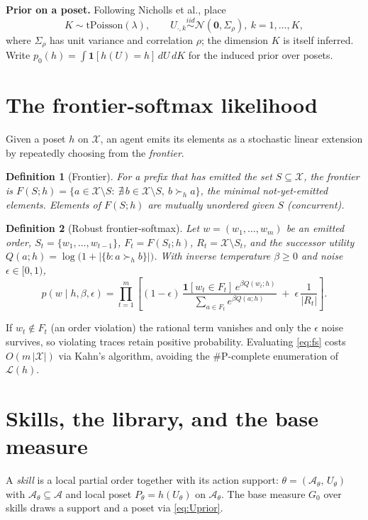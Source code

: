 \documentclass[11pt]{article}
\newtheorem{definition}{Definition}
\newcommand{\sA}{\mathcal{A}}
\newcommand{\sX}{\mathcal{X}}
\newcommand{\sL}{\mathcal{L}}
\newcommand{\ind}[1]{\mathbf{1}\!\left[#1\right]}
\newcommand{\Pois}{\mathrm{tPoisson}}
\begin{document}
\noindent
\textbf{Prior on a poset.} Following Nicholls et al., place
\begin{equation}
K\sim\Pois(\lambda),\qquad U_{\cdot,k}\stackrel{iid}{\sim}\mathcal{N}(\bm 0,\Sigma_\rho),\ k=1,\dots,K,
\label{eq:Uprior}
\end{equation}
where $\Sigma_\rho$ has unit variance and correlation $\rho$; the dimension $K$ is itself inferred. Write
$p_0(h)=\int \ind{h(U)=h}\,dU\,dK$ for the induced prior over posets.

\section{The frontier-softmax likelihood}
Given a poset $h$ on $\sX$, an agent emits its elements as a stochastic linear extension by repeatedly
choosing from the \emph{frontier}.
\begin{definition}[Frontier]
For a prefix that has emitted the set $S\subseteq\sX$, the frontier is
$F(S;h)=\{a\in\sX\setminus S:\ \nexists\,b\in\sX\setminus S,\ b\succ_h a\}$,
the minimal not-yet-emitted elements. Elements of $F(S;h)$ are mutually unordered given $S$ (concurrent).
\end{definition}
\begin{definition}[Robust frontier-softmax]
\label{def:fs}
Let $w=(w_1,\dots,w_m)$ be an emitted order, $S_t=\{w_1,\dots,w_{t-1}\}$, $F_t=F(S_t;h)$,
$R_t=\sX\setminus S_t$, and the successor utility $Q(a;h)=\log\!\big(1+|\{b:a\succ_h b\}|\big)$. With
inverse temperature $\beta\ge0$ and noise $\epsilon\in[0,1)$,
\begin{equation}
p(w\mid h,\beta,\epsilon)=\prod_{t=1}^{m}\left[(1-\epsilon)\,
\frac{\ind{w_t\in F_t}\,e^{\beta Q(w_t;h)}}{\sum_{a\in F_t}e^{\beta Q(a;h)}}
\;+\;\epsilon\,\frac{1}{|R_t|}\right].
\label{eq:fs}
\end{equation}
\end{definition}
If $w_t\notin F_t$ (an order violation) the rational term vanishes and only the $\epsilon$ noise survives,
so violating traces retain positive probability. Evaluating \eqref{eq:fs} costs $O(m\,|\sX|)$ via Kahn's
algorithm, avoiding the \#P-complete enumeration of $\sL(h)$.

\section{Skills, the library, and the base measure}
A \emph{skill} is a local partial order together with its action support:
$\theta=(\sA_\theta,\,U_\theta)$ with $\sA_\theta\subseteq\sA$ and local poset $P_\theta=h(U_\theta)$ on
$\sA_\theta$. The base measure $G_0$ over skills draws a support and a poset via \eqref{eq:Uprior}.
\end{document}
